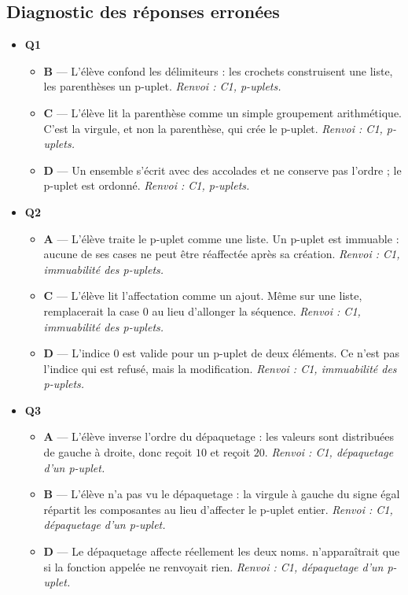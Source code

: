 \subsection*{Diagnostic des réponses erronées}

\begin{itemize}
  \item \textbf{Q1}
  \begin{itemize}
    \item \textbf{B} — L'élève confond les délimiteurs : les crochets construisent une liste, les parenthèses un p-uplet. \emph{Renvoi : C1, p-uplets.}
    \item \textbf{C} — L'élève lit la parenthèse comme un simple groupement arithmétique. C'est la virgule, et non la parenthèse, qui crée le p-uplet. \emph{Renvoi : C1, p-uplets.}
    \item \textbf{D} — Un ensemble s'écrit avec des accolades et ne conserve pas l'ordre ; le p-uplet est ordonné. \emph{Renvoi : C1, p-uplets.}
  \end{itemize}
  \item \textbf{Q2}
  \begin{itemize}
    \item \textbf{A} — L'élève traite le p-uplet comme une liste. Un p-uplet est immuable : aucune de ses cases ne peut être réaffectée après sa création. \emph{Renvoi : C1, immuabilité des p-uplets.}
    \item \textbf{C} — L'élève lit l'affectation comme un ajout. Même sur une liste,  remplacerait la case $0$ au lieu d'allonger la séquence. \emph{Renvoi : C1, immuabilité des p-uplets.}
    \item \textbf{D} — L'indice $0$ est valide pour un p-uplet de deux éléments. Ce n'est pas l'indice qui est refusé, mais la modification. \emph{Renvoi : C1, immuabilité des p-uplets.}
  \end{itemize}
  \item \textbf{Q3}
  \begin{itemize}
    \item \textbf{A} — L'élève inverse l'ordre du dépaquetage : les valeurs sont distribuées de gauche à droite, donc  reçoit $10$ et  reçoit $20$. \emph{Renvoi : C1, dépaquetage d'un p-uplet.}
    \item \textbf{B} — L'élève n'a pas vu le dépaquetage : la virgule à gauche du signe égal répartit les composantes au lieu d'affecter le p-uplet entier. \emph{Renvoi : C1, dépaquetage d'un p-uplet.}
    \item \textbf{D} — Le dépaquetage affecte réellement les deux noms.  n'apparaîtrait que si la fonction appelée ne renvoyait rien. \emph{Renvoi : C1, dépaquetage d'un p-uplet.}

\end{itemize}
\end{itemize}
